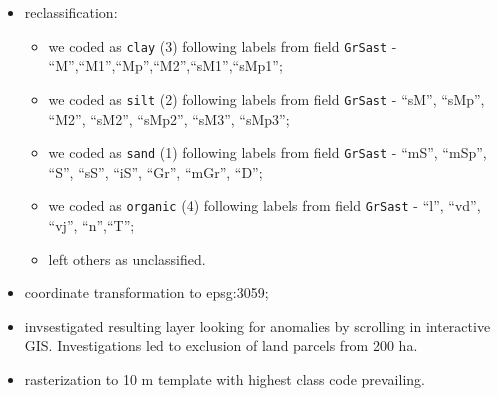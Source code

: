 \documentclass[
]{book}
\newcommand{\passthrough}[1]{#1}
\begin{document}
\begin{itemize}
\item
  reclassification:

  \begin{itemize}
  \item
    we coded as \passthrough{\lstinline!clay!} (3) following labels from field \passthrough{\lstinline!GrSast!} - ``M'',``M1'',``Mp'',``M2'',``sM1'',``sMp1'';
  \item
    we coded as \passthrough{\lstinline!silt!} (2) following labels from field \passthrough{\lstinline!GrSast!} - ``sM'', ``sMp'', ``M2'', ``sM2'', ``sMp2'', ``sM3'', ``sMp3'';
  \item
    we coded as \passthrough{\lstinline!sand!} (1) following labels from field \passthrough{\lstinline!GrSast!} - ``mS'', ``mSp'', ``S'', ``sS'', ``iS'', ``Gr'', ``mGr'', ``D'';
  \item
    we coded as \passthrough{\lstinline!organic!} (4) following labels from field \passthrough{\lstinline!GrSast!} - ``l'', ``vd'', ``vj'', ``n'',``T'';
  \item
    left others as unclassified.
  \end{itemize}
\item
  coordinate transformation to epsg:3059;
\item
  invsestigated resulting layer looking for anomalies by scrolling in interactive
  GIS. Investigations led to exclusion of land parcels from 200 ha.
\item
  rasterization to 10 m template with highest class code prevailing.
\end{itemize}
\end{document}

